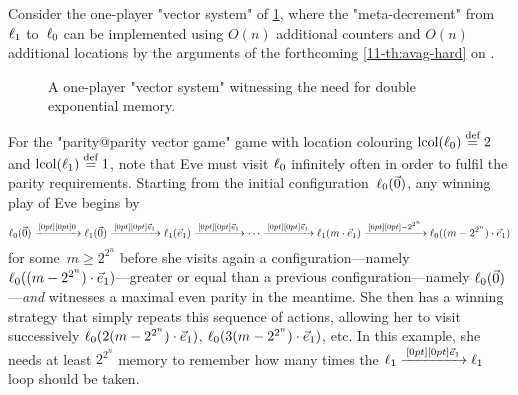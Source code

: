 
\begin{example}
  Consider the one-player "vector system" of \cref{11-fig:finitemem},
  where the "meta-decrement" from~$\ell_1$ to~$\ell_0$ can be
  implemented using $O(n)$ additional counters and $O(n)$ additional
  locations by the arguments of the forthcoming \cref{11-th:avag-hard}
  on .
  
  \begin{figure}[htbp]
    \centering
  \caption{A one-player "vector system"
  witnessing the need for double exponential memory.}\label{11-fig:finitemem}
  \end{figure}

  For the "parity@parity vector game" game with location colouring
  $\mathrm{lcol}(\ell_0)\stackrel{\!\,\!\,{{\textrm{def}}}}{=} 2$ and $\mathrm{lcol}(\ell_1)\stackrel{\!\,\!\,{{\textrm{def}}}}{=} 1$, note that Eve 
  must visit $\ell_0$ infinitely often in order to fulfil the parity
  requirements.  Starting from the initial
  configuration~$\ell_0(\vec 0)$, any winning play of Eve begins
  by \begin{equation*} \ell_0(\vec 0)\xrightarrow{\,[0pt][0pt]{\scriptsize{0}}\,}\ell_1(\vec 0)\xrightarrow{\,[0pt][0pt]{\scriptsize{\vec
      e_1}}\,}\ell_1(\vec e_1)\xrightarrow{\,[0pt][0pt]{\scriptsize{\vec e_1}}\,}\cdots\xrightarrow{\,[0pt][0pt]{\scriptsize{\vec
      e_1}}\,}\ell_1(m\cdot\vec
    e_1)\xrightarrow{\,[6pt][0pt]{\scriptsize{-2^{2^n}}}\,}\ell_0((m-2^{2^n})\cdot\vec
    e_1) \end{equation*} for some~$m\geq 2^{2^n}$ before she visits
  again a
  configuration---namely~$\ell_0((m-2^{2^n})\cdot\vec e_1)$---greater
  or equal than a previous configuration---namely
  $\ell_0(\vec 0)$---\emph{and} witnesses a maximal even parity in the
  meantime.  She then has a winning strategy that simply repeats this
  sequence of actions, allowing her to visit successively
  $\ell_0(2(m-2^{2^n})\cdot\vec e_1)$,
  $\ell_0(3(m-2^{2^n})\cdot\vec e_1)$, etc.  In this example, she
  needs at least $2^{2^n}$ memory to remember how many times the
  $\ell_1\xrightarrow{\,[0pt][0pt]{\scriptsize{\vec e_1}}\,}\ell_1$ loop should be taken.
\end{example}

